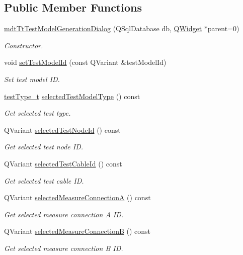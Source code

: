 \subsection*{Public Member Functions}
\begin{DoxyCompactItemize}
\item 
\hyperlink{classmdt_tt_test_model_generation_dialog_a41cf108d3dd4f65337b6ee821aa61f75}{mdt\-Tt\-Test\-Model\-Generation\-Dialog} (Q\-Sql\-Database db, \hyperlink{class_q_widget}{Q\-Widget} $\ast$parent=0)
\begin{DoxyCompactList}\small\item\em Constructor. \end{DoxyCompactList}\item 
void \hyperlink{classmdt_tt_test_model_generation_dialog_a8a96851eb1dbc343f8ca8b7fb7e2cd63}{set\-Test\-Model\-Id} (const Q\-Variant \&test\-Model\-Id)
\begin{DoxyCompactList}\small\item\em Set test model I\-D. \end{DoxyCompactList}\item 
\hyperlink{classmdt_tt_test_model_generation_dialog_a833486450bf0b6414015ab3b8e8432da}{test\-Type\-\_\-t} \hyperlink{classmdt_tt_test_model_generation_dialog_ad98f90e611b2ea423ddbd06fe8520ebd}{selected\-Test\-Model\-Type} () const 
\begin{DoxyCompactList}\small\item\em Get selected test type. \end{DoxyCompactList}\item 
Q\-Variant \hyperlink{classmdt_tt_test_model_generation_dialog_aaa97c8f06a9e983bb0b595df9f708855}{selected\-Test\-Node\-Id} () const 
\begin{DoxyCompactList}\small\item\em Get selected test node I\-D. \end{DoxyCompactList}\item 
Q\-Variant \hyperlink{classmdt_tt_test_model_generation_dialog_a96d923096ff088bb6c249e86d8ff1a6c}{selected\-Test\-Cable\-Id} () const 
\begin{DoxyCompactList}\small\item\em Get selected test cable I\-D. \end{DoxyCompactList}\item 
Q\-Variant \hyperlink{classmdt_tt_test_model_generation_dialog_ac260b213d3e4a4b3750ed97c2324a78a}{selected\-Measure\-Connection\-A} () const 
\begin{DoxyCompactList}\small\item\em Get selected measure connection A I\-D. \end{DoxyCompactList}\item 
Q\-Variant \hyperlink{classmdt_tt_test_model_generation_dialog_a8feafc167ed75afc38ff7c5160e2f559}{selected\-Measure\-Connection\-B} () const 
\begin{DoxyCompactList}\small\item\em Get selected measure connection B I\-D. \end{DoxyCompactList}\end{DoxyCompactItemize}


